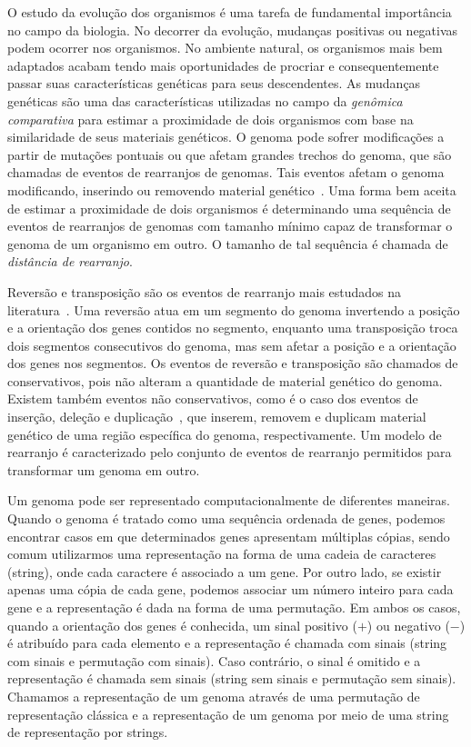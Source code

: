 
O estudo da evolução dos organismos é uma tarefa de fundamental importância no campo da biologia. No decorrer da evolução, mudanças positivas ou negativas podem ocorrer nos organismos. No ambiente natural, os organismos mais bem adaptados acabam tendo mais oportunidades de procriar e consequentemente passar suas características genéticas para seus descendentes. As mudanças genéticas são uma das características utilizadas no campo da \emph{genômica comparativa} para estimar a proximidade de dois organismos com base na similaridade de seus materiais genéticos. O genoma pode sofrer modificações a partir de mutações pontuais ou que afetam grandes trechos do genoma, que são chamadas de eventos de rearranjos de genomas. Tais eventos afetam o genoma modificando, inserindo ou removendo material genético~\cite{2009-fertin-etal}. Uma forma bem aceita de estimar a proximidade de dois organismos é determinando uma sequência de eventos de rearranjos de genomas com tamanho mínimo capaz de transformar o genoma de um organismo em outro. O tamanho de tal sequência é chamada de \emph{distância de rearranjo}.

Reversão e transposição são os eventos de rearranjo mais estudados na literatura~\cite{1999-hannenhalli-pevzner,1999b-caprara,2012-bulteau-etal,2019b-oliveira-etal}. Uma reversão atua em um segmento do genoma invertendo a posição e a orientação dos genes contidos no segmento, enquanto uma transposição troca dois segmentos consecutivos do genoma, mas sem afetar a posição e a orientação dos genes nos segmentos. Os eventos de reversão e transposição são chamados de conservativos, pois não alteram a quantidade de material genético do genoma. Existem também eventos não conservativos, como é o caso dos eventos de inserção, deleção e duplicação~\cite{2013-willing-etal,2012-elmabrouk-sankoff,2008-kahn-raphael,2020-mane-etal,2009-bader}, que inserem, removem e duplicam material genético de uma região específica do genoma, respectivamente. Um modelo de rearranjo é caracterizado pelo conjunto de eventos de rearranjo permitidos para transformar um genoma em outro.

Um genoma pode ser representado computacionalmente de diferentes maneiras. Quan\-do o genoma é tratado como uma sequência ordenada de genes, podemos encontrar casos em que determinados genes apresentam múltiplas cópias, sendo comum utilizarmos uma representação na forma de uma cadeia de caracteres (string), onde cada caractere é associado a um gene. Por outro lado, se existir apenas uma cópia de cada gene, podemos associar um número inteiro para cada gene e a representação é dada na forma de uma permutação. Em ambos os casos, quando a orientação dos genes é conhecida, um sinal positivo ($+$) ou negativo ($-$) é atribuído para cada elemento e a representação é chamada com sinais (string com sinais e permutação com sinais). Caso contrário, o sinal é omitido e a representação é chamada sem sinais (string sem sinais e permutação sem sinais). Chamamos a representação de um genoma através de uma permutação de representação clássica e a representação de um genoma por meio de uma string de representação por strings.

